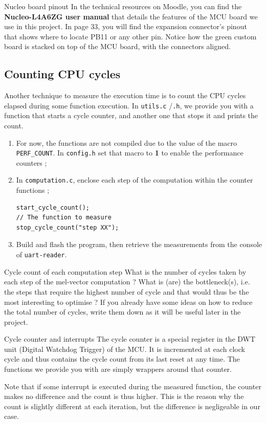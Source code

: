 \begin{bclogo}[couleur = gray!20, arrondi = 0.2, logo=\bcinfo]{Nucleo board pinout}
In the technical resources on Moodle, you can find the \textbf{Nucleo-L4A6ZG user manual} that details the features of the MCU board we use in this project. In page 33, you will find the expansion connector's pinout that shows where to locate PB11 or any other pin. Notice how the green custom board is stacked on top of the MCU board, with the connectors aligned.
\end{bclogo}

\subsection{Counting CPU cycles}

Another technique to measure the execution time is to count the CPU cycles elapsed during some function execution. In \texttt{utils.c}
/\texttt{.h}, we provide you with a function that starts a cycle counter, and another one that stops it and prints the count.
\begin{enumerate}
	\item For now, the functions are not compiled due to the value of the macro \texttt{PERF\_COUNT}. In \texttt{config.h} set that macro to \textbf{1} to enable the performance counters ;
	\item In \texttt{computation.c}, enclose each step of the computation within the counter functions ;
\begin{lstlisting}[columns=fullflexible]
start_cycle_count();
// The function to measure
stop_cycle_count("step XX");
\end{lstlisting}
	\item Build and flash the program, then retrieve the measurements from the console of \texttt{uart-reader}.
\end{enumerate}

\begin{bclogo}[couleur = gray!20, arrondi = 0.2, logo=\bcquestion]{Cycle count of each computation step}
What is the number of cycles taken by each step of the mel-vector computation ? What is (are) the bottleneck(s), i.e. the steps that require the highest number of cycle and that would thus be the most interesting to optimise ? If you already have some ideas on how to reduce the total number of cycles, write them down as it will be useful later in the project.
\end{bclogo}

\begin{bclogo}[couleur = gray!20, arrondi = 0.2, logo=\bcinfo]{Cycle counter and interrupts}
The cycle counter is a special register in the DWT unit (Digital Watchdog Trigger) of the MCU. It is incremented at each clock cycle and thus contains the cycle count from its last reset at any time. The functions we provide you with are simply wrappers around that counter.

Note that if some interrupt is executed during the measured function, the counter makes no difference and the count is thus higher. This is the reason why the count is slightly different at each iteration, but the difference is negligeable in our case.
\end{bclogo}

